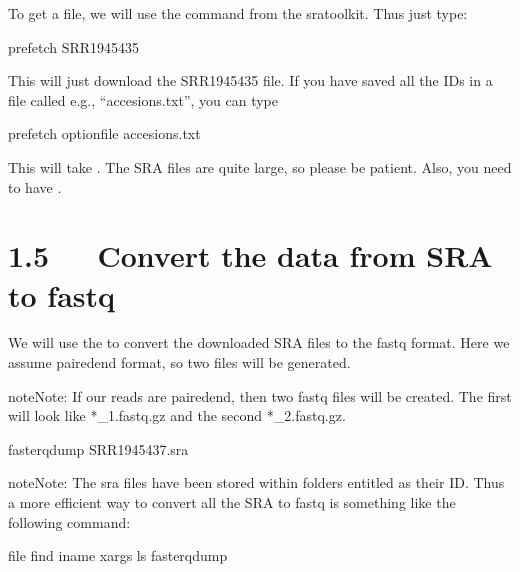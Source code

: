\documentclass[letterpaper,10pt,english]{sphinxmanual}
\begin{document}
\sphinxAtStartPar
To get a file, we will use the  command from the sra\sphinxhyphen{}toolkit. Thus just type:

\begin{sphinxVerbatim}[commandchars=\\\{\}]
prefetch SRR1945435
\end{sphinxVerbatim}

\sphinxAtStartPar
This will just download the SRR1945435 file. If you have saved all the IDs in a file called e.g., “accesions.txt”, you can type

\begin{sphinxVerbatim}[commandchars=\\\{\}]
prefetch \PYGZhy{}\PYGZhy{}option\PYGZhy{}file accesions.txt
\end{sphinxVerbatim}

\sphinxAtStartPar
This will take . The SRA files are quite large, so please be patient. Also, you need to have .


\chapter{1.5   Convert the data from SRA to fastq}
\label{\detokenize{index:convert-the-data-from-sra-to-fastq}}
\sphinxAtStartPar
We will use the  to convert the downloaded SRA files to the fastq format. Here we assume paired\sphinxhyphen{}end format, so two files will be generated.

\begin{sphinxadmonition}{note}{Note:}
\sphinxAtStartPar
If our reads are paired\sphinxhyphen{}end, then two fastq files will be created. The first will look like *\_1.fastq.gz and the second *\_2.fastq.gz.
\end{sphinxadmonition}

\begin{sphinxVerbatim}[commandchars=\\\{\}]
fasterq\PYGZhy{}dump SRR1945437.sra
\end{sphinxVerbatim}

\begin{sphinxadmonition}{note}{Note:}
\sphinxAtStartPar
The sra files have been stored within folders entitled as their ID. Thus a more efficient way to convert all the SRA to fastq is something like the following command:

\begin{sphinxVerbatim}[commandchars=\\\{\}]
 file  find \PYGZhy{}iname   xargs ls 
 
fasterq\PYGZhy{}dump 
\end{sphinxVerbatim}
\end{sphinxadmonition}
\end{document}
